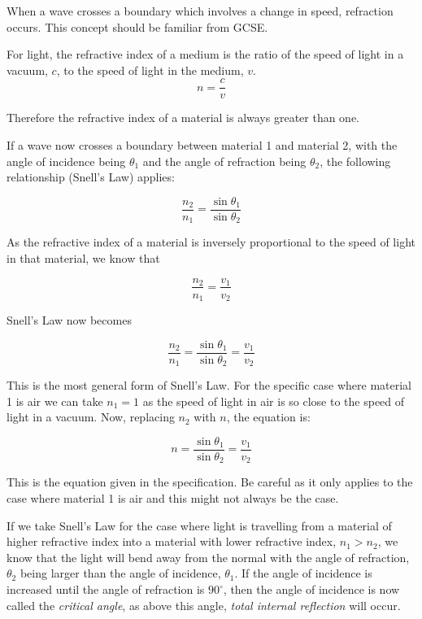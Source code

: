 \documentclass[revision-guide.tex]{subfiles}
\begin{document}

When a wave crosses a boundary which involves a change in speed, refraction occurs. This concept should be familiar from GCSE.


For light, the refractive index of a medium is the ratio of the speed of light in a vacuum, $c$, to the speed of light in the medium, $v$.
\[n = \frac{c}{v}\]

Therefore the refractive index of a material is always greater than one.

If a wave now crosses a boundary between material 1 and material 2, with the angle of incidence being $\theta_1$ and the angle of refraction being $\theta_2$, the following relationship (Snell's Law) applies:

\[ \frac{n_2}{n_1} = \frac{\sin{\theta_1}}{\sin{\theta_2}}\]

As the refractive index of a material is inversely proportional to the speed of light in that material, we know that

\[\frac{n_2}{n_1} = \frac{v_1}{v_2} \]

Snell's Law now becomes

\[ \frac{n_2}{n_1} = \frac{\sin{\theta_1}}{\sin{\theta_2}} =  \frac{v_1}{v_2}\]

This is the most general form of Snell's Law. For the specific case where material 1 is air we can take $n_1 = 1$ as the speed of light in air is so close to the speed of light in a vacuum. Now, replacing $n_2$ with $n$, the equation is:

\[ n = \frac{\sin{\theta_1}}{\sin{\theta_2}} = \frac{v_1}{v_2}\]

This is the equation given in the specification. Be careful as it only applies to the case where material 1 is air and this might not always be the case.


If we take Snell's Law for the case where light is travelling from a material of higher refractive index into a material with lower refractive index, $n_1 > n_2$, we know that the light will bend away from the normal with the angle of refraction, $\theta_2$ being larger than the angle of incidence, $\theta_1$. If the angle of incidence is increased until the angle of refraction is $90^{\circ}$, then the angle of incidence is now called the \emph{critical angle}, as above this angle, \emph{total internal reflection} will occur.
\end{document}
